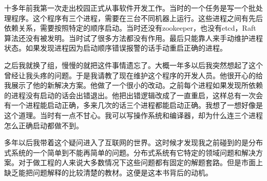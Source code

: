 十多年前我第一次走出校园正式从事软件开发工作。当时的一个任务是写一个批处理程序。这个程序有三个进程，需要在三台不同机器上运行。这些进程之间有先后依赖关系，需要按照特定的顺序启动。当时还没有zookeeper，也没有etcd，Raft算法还没有被发明。当时试了很多方法都没有作用。最后只能靠人来手动维护进程状态。如果发现进程因为启动顺序错误报警的话手动重启正确的进程。


之后我就换了组，慢慢的就把这件事情遗忘了。大概一年多以后我突然想起了这个曾经让我头疼的问题。于是我请教了现在维护这个程序的开发人员。他很开心的给我展示了他的新解决方案。他做了一个很小的改动。之前每个进程如果发现所依赖的进程没有启动的话会出错退出。他把出错逻辑改成了一直重启，这样总有一次会有一个进程能启动正确，多来几次的话三个进程都能启动正确。我想了一想好像是这个道理。当时有一点不甘心。我可以写操作系统和编译器，却为什么连三个进程怎么正确启动都做不到。


多年以后我带着这个疑问进入了互联网的世界。这时候才发现我之前碰到的是分布式系统的一个简单到不能再简单的问题。分布式系统有它特定的领域问题和解决方案。对于做工程的人来说大多数情况下这些问题都有固定的解题套路。但是市面上缺乏能把问题解释的比较清楚的教材。这便是这本书背后的动机。
